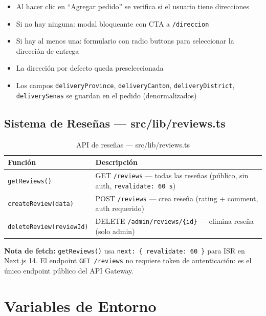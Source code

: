 \documentclass[12pt,a4paper]{article}
\begin{document}
\begin{itemize}
  \item Al hacer clic en ``Agregar pedido'' se verifica si el usuario tiene direcciones
  \item Si no hay ninguna: modal bloqueante con CTA a \texttt{/direccion}
  \item Si hay al menos una: formulario con radio buttons para seleccionar la dirección de entrega
  \item La dirección por defecto queda preseleccionada
  \item Los campos \texttt{deliveryProvince}, \texttt{deliveryCanton}, \texttt{deliveryDistrict},
    \texttt{deliverySenas} se guardan en el pedido (denormalizados)
\end{itemize}

\subsection{Sistema de Reseñas --- src/lib/reviews.ts}

\begin{table}[H]
\centering
\begin{tabular}{@{}ll@{}}
\toprule
\textbf{Función} & \textbf{Descripción} \\
\midrule
\texttt{getReviews()} & GET \texttt{/reviews} --- todas las reseñas (público, sin auth, \texttt{revalidate: 60\,s}) \\
\texttt{createReview(data)} & POST \texttt{/reviews} --- crea reseña (rating + comment, auth requerido) \\
\texttt{deleteReview(reviewId)} & DELETE \texttt{/admin/reviews/\{id\}} --- elimina reseña (solo admin) \\
\bottomrule
\end{tabular}
\caption{API de reseñas --- src/lib/reviews.ts}
\end{table}

\begin{nexobox}
\textbf{Nota de fetch:} \texttt{getReviews()} usa \texttt{next: \{ revalidate: 60 \}}
para ISR en Next.js 14. El endpoint \texttt{GET /reviews} no requiere token de
autenticación: es el único endpoint público del API Gateway.
\end{nexobox}

\section{Variables de Entorno}
\end{document}
